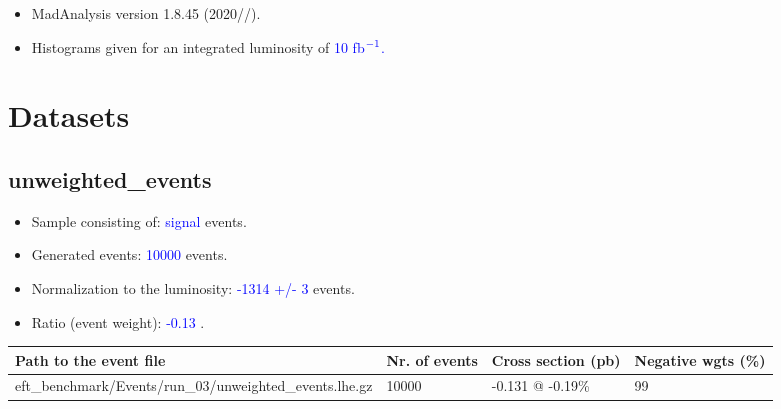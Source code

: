 \documentclass[a4paper, 10pt]{article}
\begin{document}
\begin{itemize}
  \item MadAnalysis version 1.8.45 (2020//).
   \item Histograms given for an integrated luminosity of \textcolor{blue}{10}\textcolor{blue}{ fb}$^{\textcolor{blue}{-1}}$\textcolor{blue}{.}
\textcolor{blue}{}
\end{itemize}
\newpage
\section{ Datasets}

\subsection{ unweighted\_events}

\begin{itemize}
  \item Sample consisting of: \textcolor{blue}{signal}  events.
   \item Generated events: \textcolor{blue}{10000 }  events.
   \item Normalization to the luminosity: \textcolor{blue}{-1314}\textcolor{blue}{ +/\-- }\textcolor{blue}{3 }  events.
   \item Ratio (event weight): \textcolor{blue}{-0.13 } .  
 
\end{itemize}
\begin{table}[H]
  \begin{center}
    \begin{tabular}{|m{55.0mm}|m{25.0mm}|m{30.0mm}|m{30.0mm}|}
      \hline
      {\cellcolor{yellow}         Path to the event file}& {\cellcolor{yellow}         Nr. of events}& {\cellcolor{yellow}         Cross section (pb)}& {\cellcolor{yellow}         Negative wgts (\%)}\\
      \hline
      {\cellcolor{white}          eft\_benchmark/\-Events/\-run\_03/\-unweighted\_events.lhe.gz}& {\cellcolor{white}          10000}& {\cellcolor{white}          -0.131 @ -0.19\%}& {\cellcolor{white}          99}\\
\hline
    \end{tabular}
  \end{center}
\end{table}
\end{document}
